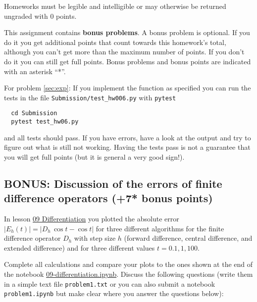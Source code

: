 \documentclass[paper=letter]{scrartcl}
\newcommand{\anumber}{6}
\newcommand{\anum}{0\anumber}
\begin{document}
Homeworks must be legible and intelligible or may otherwise be
returned ungraded with 0 points.

This assignment contains \textbf{bonus problems}. A bonus problem is
optional. If you do it you get additional points that count towards
this homework's total, although you can't get more than the maximum
number of points. If you don't do it you can still get full
points. Bonus problems and bonus points are indicated with an asterisk
``*''.

For problem \ref{sec:exp}: If you implement the
function as specified you can run the tests in the file
\texttt{Submission/test\_hw0\anum.py} with \texttt{pytest}
\begin{verbatim}
  cd Submission
  pytest test_hw06.py
\end{verbatim}
and all tests should pass. If you have errors, have a look at the
output and try to figure out what is still not working. Having the
tests pass is not a guarantee that you will get full points (but it is
general a very good sign!). 

\subsection{BONUS: Discussion of the errors of finite difference operators
  (+7* bonus points)}
\label{sec:fderrors}

In lesson
\href{https://asu-compmethodsphysics-phy494.github.io/ASU-PHY494/2020/02/25/09_Differentiation/}{09 Differentiation} you plotted the absolute error
$|E_{h}(t)| = |D_{h}\,\cos t - \cos t|$ for three different algorithms
for the finite difference operator $D_{h}$ with step size $h$ (forward
difference, central difference, and extended difference) and for three
different values $t = 0.1, 1, 100$.

Complete all calculations and compare your plots to the ones shown at
the end of the notebook
\href{https://github.com/ASU-CompMethodsPhysics-PHY494/PHY494-resources/blob/master/09_differentiation/09-differentiation.ipynb}{09-differentiation.ipynb}. Discuss
the following questions (write them in a simple text file
\texttt{problem1.txt} or you can also submit a notebook
\texttt{problem1.ipynb} but make clear where you answer the questions
below):
\end{document}
